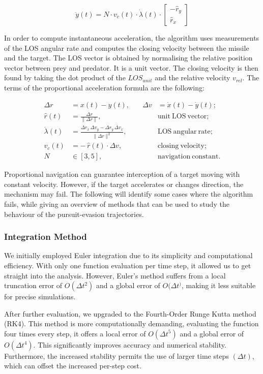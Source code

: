 \documentclass[11pt]{article}
\begin{document}
\[
\ddot{y}(t) = N \cdot v_c(t) \cdot \dot{\lambda}(t) \cdot \begin{bmatrix} -\hat{r}_y \\ \hat{r}_x \end{bmatrix}
\]

In order to compute instantaneous acceleration, the algorithm uses measurements of the LOS angular rate and computes the closing velocity between the missile and the target. The LOS vector is obtained by normalising the relative position vector between prey and predator. It is a unit vector. The closing velocity is then found by taking the dot product of the $\textit{LOS}_{unit}$ and the relative velocity $\textit{v}_{rel}$. The terms of the proportional acceleration formula are the following:

\[
\begin{aligned}
\Delta r &= x(t) - y(t), 
&\quad \Delta v &= \dot x(t) - \dot y(t);\\[0.5em]
\hat r(t) &= \frac{\Delta r}{\|\Delta r\|}, 
&\quad &\mathrm{unit\ LOS\ vector};\\
\dot\lambda(t) &= \frac{\Delta r_x\,\Delta v_y - \Delta r_y\,\Delta v_x}{\|\Delta r\|^2}, 
&\quad &\mathrm{LOS\ angular\ rate};\\
v_c(t) &= -\,\hat r(t)\cdot\Delta v, 
&\quad &\mathrm{closing\ velocity};\\
N &\in [3,5], 
&\quad &\mathrm{navigation\ constant}.
\end{aligned}
\]



Proportional navigation can guarantee interception of a target moving with constant velocity. However, if the target accelerates or changes direction, the mechanism may fail. The following will identify some cases where the algorithm fails, while giving an overview of methods that can be used to study the behaviour of the pursuit-evasion trajectories.

\subsubsection{Integration Method}
We initially employed Euler integration due to its simplicity and computational efficiency. With only one function evaluation per time step, it allowed us to get straight into the analysis. However, Euler's method suffers from a local truncation error of $O(\Delta t^2)$ and a global error of $O(\Delta t^)$, making it less suitable for precise simulations.

After further evaluation, we upgraded to the Fourth-Order Runge Kutta method (RK4). This method is more computationally demanding, evaluating the function four times every step, it offers a local error of $O(\Delta t^5)$ and a global error of $O(\Delta t^4)$. This significantly improves accuracy and numerical stability. Furthermore, the increased stability permits the use of larger time steps $(\Delta t)$, which can offset the increased per-step cost.
\end{document}
